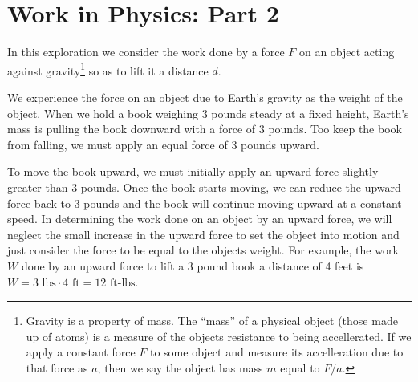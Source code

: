\documentclass[12pt,letterpaper,fleqn]{article}
\theoremstyle{definition}
\begin{document}
\section*{Work in Physics: Part 2}
In this exploration we consider the work done by a force $F$ on an object acting against gravity\footnote{Gravity is a property of mass. The ``mass'' of a physical object (those made up of atoms) is a measure of the objects resistance to being accellerated. If we apply a constant force $F$ to some object and measure its accelleration due to that force as $a$, then we say the object has mass $m$ equal to $F/a$.} so as to lift it a distance $d$.

We experience the force on an object due to Earth's gravity as the weight of the object. When we hold a book weighing 3 pounds steady at a fixed height, Earth's mass is pulling the book downward with a force of 3 pounds. Too keep the book from falling, we must apply an equal force of 3 pounds upward.

To move the book upward, we must initially apply an upward force slightly greater than 3 pounds. Once the book starts moving, we can reduce the upward force back to 3 pounds and the book will continue moving upward at a constant speed. In determining the work done on an object by an upward force, we will neglect the small increase in the upward force to set the object into motion and just consider the force to be equal to the objects weight. For example, the work $W$ done by an upward force to lift a 3 pound book a distance of 4 feet is $W = 3\text{ lbs}\cdot 4\text{ ft} = 12\text{ ft-lbs}$.
\end{document}
